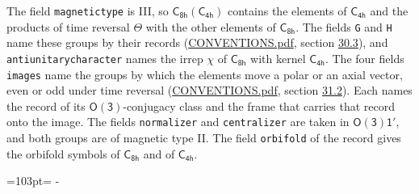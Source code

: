 \documentclass[10pt,a4paper]{article}
\newcommand{\needspace}[1]{\par\penalty-100\begingroup\dimen0=#1\relax\dimen2=\pagegoal
  \advance\dimen2-\pagetotal\ifdim\dimen0>\dimen2\relax\ifdim\dimen2>0pt\vfil\break\fi\fi
  \endgroup}
\numberwithin{equation}{section}
\newcommand{\grp}[1]{\mathsf{#1}}
\begin{document}
The field \texttt{magnetictype} is III, so $\grp{C_{8h}}(\grp{C_{4h}})$ contains the elements of $\grp{C_{4h}}$ and the products of time reversal $\varTheta$ with the other elements of $\grp{C_{8h}}$. The fields \texttt{G} and \texttt{H} name these groups by their records (\href{../../CONVENTIONS.pdf}{CONVENTIONS.pdf}, section \href{../../CONVENTIONS.pdf\#conv.30.3}{30.3}), and \texttt{antiunitarycharacter} names the irrep $\chi$ of $\grp{C_{8h}}$ with kernel $\grp{C_{4h}}$. The four fields \texttt{images} name the groups by which the elements move a polar or an axial vector, even or odd under time reversal (\href{../../CONVENTIONS.pdf}{CONVENTIONS.pdf}, section \href{../../CONVENTIONS.pdf\#conv.31.2}{31.2}). Each names the record of its $\grp{O(3)}$-conjugacy class and the frame that carries that record onto the image. The fields \texttt{normalizer} and \texttt{centralizer} are taken in $\grp{O(3)1'}$, and both groups are of magnetic type II. The field \texttt{orbifold} of the record gives the orbifold symbols of $\grp{C_{8h}}$ and of $\grp{C_{4h}}$.
\needspace{103pt}
\end{document}
